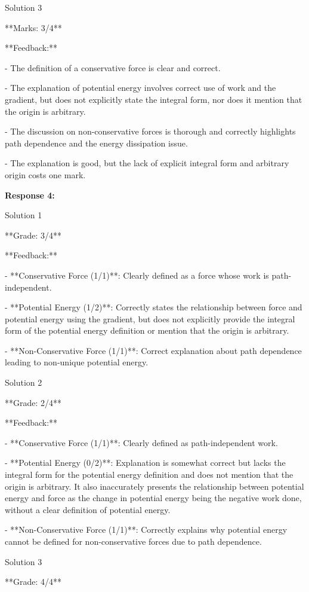 \documentclass[a4paper,11pt]{article}
\begin{document}
Solution 3

**Marks: 3/4**

**Feedback:**

- The definition of a conservative force is clear and correct.

- The explanation of potential energy involves correct use of work and the gradient, but does not explicitly state the integral form, nor does it mention that the origin is arbitrary.

- The discussion on non-conservative forces is thorough and correctly highlights path dependence and the energy dissipation issue.

- The explanation is good, but the lack of explicit integral form and arbitrary origin costs one mark.

\bigskip
\textbf{Response 4:}

Solution 1

**Grade: 3/4**

**Feedback:**

- **Conservative Force (1/1)**: Clearly defined as a force whose work is path-independent.

- **Potential Energy (1/2)**: Correctly states the relationship between force and potential energy using the gradient, but does not explicitly provide the integral form of the potential energy definition or mention that the origin is arbitrary.

- **Non-Conservative Force (1/1)**: Correct explanation about path dependence leading to non-unique potential energy.

Solution 2

**Grade: 2/4**

**Feedback:**

- **Conservative Force (1/1)**: Clearly defined as path-independent work.

- **Potential Energy (0/2)**: Explanation is somewhat correct but lacks the integral form for the potential energy definition and does not mention that the origin is arbitrary. It also inaccurately presents the relationship between potential energy and force as the change in potential energy being the negative work done, without a clear definition of potential energy.

- **Non-Conservative Force (1/1)**: Correctly explains why potential energy cannot be defined for non-conservative forces due to path dependence.

Solution 3

**Grade: 4/4**
\end{document}
